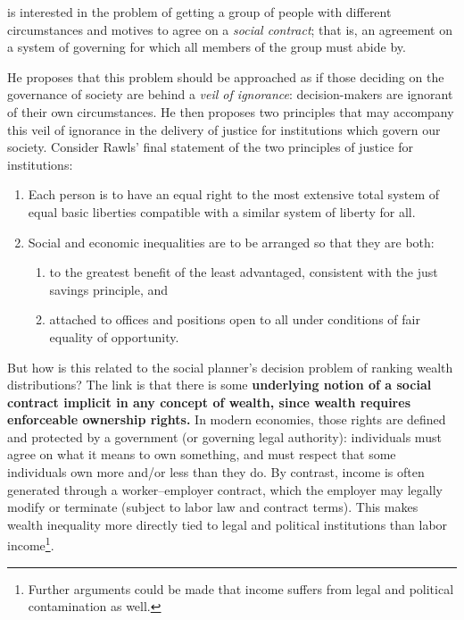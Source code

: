 \documentclass[../../../00-main.tex]{subfiles}
\begin{document}
\par \cite{jr71} is interested in the problem of getting a group of people with different circumstances and motives to agree on a \textit{social contract}; that is, an agreement on a system of governing for which all members of the group must abide by.

\par He proposes that this problem should be approached as if those deciding on the governance of society are behind a \textit{veil of ignorance}: decision-makers are ignorant of their own circumstances. He then proposes two principles that may accompany this veil of ignorance in the delivery of justice for institutions which govern our society. Consider Rawls' final statement of the two principles of justice for institutions:

\begin{enumerate}
\item Each person is to have an equal right to the most extensive total system of equal basic liberties compatible with a similar system of liberty for all.

\item Social and economic inequalities are to be arranged so that they are both:

\begin{enumerate}
\item to the greatest benefit of the least advantaged, consistent with the just savings principle, and
\item attached to offices and positions open to all under conditions of fair equality of opportunity.
\end{enumerate}
\end{enumerate}

\par But how is this related to the social planner's decision problem of ranking wealth distributions? The link is that there is some \textbf{underlying notion of a social contract implicit in any concept of wealth, since wealth requires enforceable ownership rights.} In modern economies, those rights are defined and protected by a government (or governing legal authority): individuals must agree on what it means to own something, and must respect that some individuals own more and/or less than they do. By contrast, income is often generated through a worker--employer contract, which the employer may legally modify or terminate (subject to labor law and contract terms). This makes wealth inequality more directly tied to legal and political institutions than labor income\footnote{Further arguments could be made that income suffers from legal and political contamination as well.}.
\end{document}
